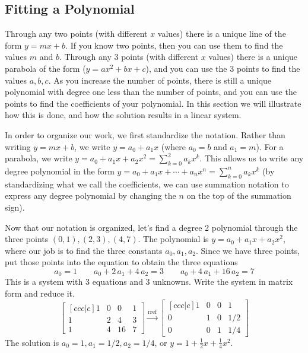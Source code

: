 \documentclass[10pt]{article}
\newcommand{\ds}{\displaystyle}
\begin{document}
\subsection{Fitting a Polynomial}
Through any two points (with different $x$ values) there is a unique line of the form $y=mx+b$. If you know two points, then you can use them to find the values $m$ and $b$.  Through any 3 points (with different $x$ values) there is a unique parabola of the form ($y=ax^2+bx+c$), and you can use the 3 points to find the values $a,b,c$.  As you increase the number of points, there is still a unique polynomial with degree one less than the number of points, and you can use the points to find the coefficients of your polynomial.  In this section we will illustrate how this is done, and how the solution results in a linear system. 

In order to organize our work, we first standardize the notation.  Rather than writing $y=mx+b$, we write $y=a_0+a_1 x$ (where $a_0=b$ and $a_1=m$).  For a parabola, we write $\ds y=a_0 + a_1 x+ a_2 x^2 = \sum_{k=0}^{2} a_k x^k$. This allows us to write any degree polynomial in the form $\ds y = a_0 + a_1 x+ \cdots + a_n x^n = \sum_{k=0}^n a_k x^k$ (by standardizing what we call the coefficients, we can use summation notation to express any degree polynomial by changing the $n$ on the top of the summation sign).

Now that our notation is organized, let's find a degree 2 polynomial through the three points $(0, 1), (2, 3), (4, 7)$.  The polynomial is $y=a_0 +a_1 x+a_2 x^2$, where our job is to find the three constants $a_0, a_1, a_2$.  Since we have three points, put those points into the equation to obtain the three equations
$$
a_{{0}}=1 \quad \quad 
a_{{0}}+2\,a_{{1}}+4\,a_{{2}}=3 \quad \quad 
a_{{0}}+4\,a_{{1}}+16\,a_{{2}}=7
$$
This is a system with 3 equations and 3 unknowns.  Write the system in matrix form and reduce it.
$$
\begin{bmatrix}[ccc|c] 
1&0&0&1\\
1&2&4&3\\
1&4&16&7
\end {bmatrix}
\xrightarrow{\text{rref}}
\begin{bmatrix}[ccc|c]
1&0&0&1\\
0&1&0&1/2\\
0&0&1&1/4
\end {bmatrix} 
$$
The solution is $a_0 = 1, a_1= 1/2, a_2=1/4$, or $y=1+\frac12 x+ \frac 14 x^2$.  
\end{document}
